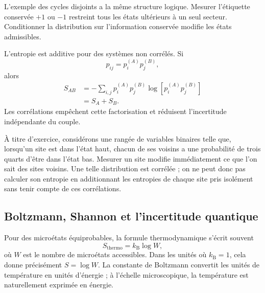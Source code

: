L’exemple des cycles disjoints a la même structure logique. Mesurer l’étiquette conservée \(+1\) ou \(-1\) restreint tous les états ultérieurs à un seul secteur. Conditionner la distribution sur l’information conservée modifie les états admissibles.

L’entropie est additive pour des systèmes non corrélés. Si
\begin{equation}
 p_{ij}=p_i^{(A)}p_j^{(B)},
\end{equation}
alors
\begin{align}
 S_{AB}
 &=-\sum_{i,j}p_i^{(A)}p_j^{(B)}
 \log\!\left[p_i^{(A)}p_j^{(B)}\right]\\
 &=S_A+S_B.
 \label{eq:sm1-entropy-additivity}
\end{align}
Les corrélations empêchent cette factorisation et réduisent l’incertitude indépendante du couple.

À titre d’exercice, considérons une rangée de variables binaires telle que, lorsqu’un site est dans l’état haut, chacun de ses voisins a une probabilité de trois quarts d’être dans l’état bas. Mesurer un site modifie immédiatement ce que l’on sait des sites voisins. Une telle distribution est corrélée ; on ne peut donc pas calculer son entropie en additionnant les entropies de chaque site pris isolément sans tenir compte de ces corrélations.

\subsection{Boltzmann, Shannon et l’incertitude quantique}

\begin{classroomqa}
\end{classroomqa}

Pour des microétats équiprobables, la formule thermodynamique s’écrit souvent
\begin{equation}
 S_{\mathrm{thermo}}=k_{\mathrm B}\log W,
 \label{eq:sm1-boltzmann-formula}
\end{equation}
où \(W\) est le nombre de microétats accessibles. Dans les unités où \(k_{\mathrm B}=1\), cela donne précisément \(S=\log W\). La constante de Boltzmann convertit les unités de température en unités d’énergie ; à l’échelle microscopique, la température est naturellement exprimée en énergie.

